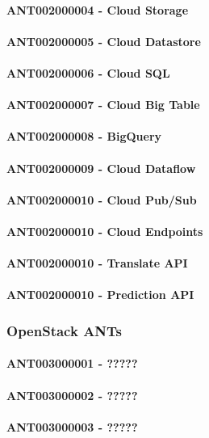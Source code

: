 \paragraph{ANT002000004 - Cloud Storage}
\paragraph{ANT002000005 - Cloud Datastore}
\paragraph{ANT002000006 - Cloud SQL}
\paragraph{ANT002000007 - Cloud Big Table}
\paragraph{ANT002000008 - BigQuery}
\paragraph{ANT002000009 - Cloud Dataflow}
\paragraph{ANT002000010 - Cloud Pub/Sub}
\paragraph{ANT002000010 - Cloud Endpoints}
\paragraph{ANT002000010 - Translate API}
\paragraph{ANT002000010 - Prediction API}
\subsubsection{OpenStack ANTs}
\paragraph{ANT003000001 - ?????}
\paragraph{ANT003000002 - ?????}
\paragraph{ANT003000003 - ?????}

